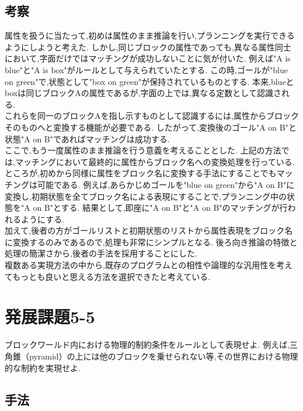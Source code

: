 \documentclass[uplatex,12pt]{jsarticle}
\begin{document}

\subsection{考察}
属性を扱うに当たって,初めは属性のまま推論を行い,プランニングを実行できるようにしようと考えた.
しかし,同じブロックの属性であっても,異なる属性同士において,字面だけではマッチングが成功しないことに気が付いた.
例えば"A is blue"と"A is box"がルールとして与えられていたとする.
この時,ゴールが"blue on green"で,状態として"box on green"が保持されているものとする.
本来,blueとboxは同じブロックAの属性であるが,字面の上では,異なる定数として認識される. \\
これらを同一のブロックAを指し示すものとして認識するには,属性からブロックそのものへと変換する機能が必要である.
したがって,変換後のゴール"A on B"と状態"A on B"であればマッチングは成功する. \\
ここで,もう一度属性のまま推論を行う意義を考えることとした.
上記の方法では,マッチングにおいて最終的に属性からブロック名への変換処理を行っている.
ところが,初めから同様に属性をブロック名に変換する手法にすることでもマッチングは可能である.
例えば,あらかじめゴールを"blue on green"から"A on B"に変換し,初期状態を全てブロック名による表現にすることで,プランニング中の状態を"A on B"とする.
結果として,即座に"A on B"と"A on B"のマッチングが行われるようにする. \\
加えて,後者の方がゴールリストと初期状態のリストから属性表現をブロック名に変換するのみであるので,処理も非常にシンプルとなる.
後ろ向き推論の特徴と処理の簡潔さから,後者の手法を採用することにした. \\
複数ある実現方法の中から,既存のプログラムとの相性や論理的な汎用性を考えてもっとも良いと思える方法を選択できたと考えている.


\section{発展課題5-5}
\begin{screen}
    ブロックワールド内における物理的制約条件をルールとして表現せよ.
    例えば,三角錐（pyramid）の上には他のブロックを乗せられない等,その世界における物理的な制約を実現せよ.
\end{screen}
\subsection{手法}
\end{document}
